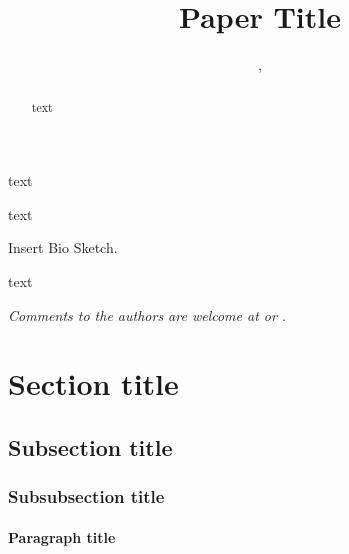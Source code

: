 \documentclass{frbaart}
\title{Paper Title}
\begin{document}



\begin{abstract}
text
\end{abstract}

\author{
  , %
}


%
%
\begin{findings}
\item text
\item text
\end{findings}



\maketitle

\begin{aboutauthors}
  Insert Bio Sketch.

\end{aboutauthors}
%
%
\begin{acks}
text
\end{acks}

\textit{Comments to the authors are welcome at
  \textup{} or
  \textup{}}.


\mainmatter


\section{Section title}

\subsection{Subsection title}


\subsubsection{Subsubsection title}


\paragraph{Paragraph title}
\end{document}
